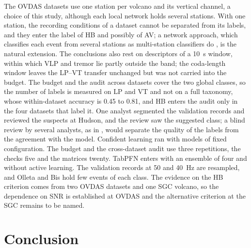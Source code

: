 \documentclass[pdflatex,sn-mathphys-num]{sn-jnl}
\begin{document}
The OVDAS datasets use one station per volcano and its vertical channel, a
choice of this study, although each local network holds several stations.
With one station, the recording conditions of a dataset cannot be separated
from its labels, and they enter the label of HB and possibly of AV; a
network approach, which classifies each event from several stations as
multi-station classifiers do \cite{salazar_multi-station_2023,ferreira_deep_2023},
is the natural extension. The conclusions also rest on descriptors of a
10~s window, within which
VLP and tremor lie partly outside the band; the coda-length window leaves
the LP--VT transfer unchanged but was not carried into the budget. The
budget and the audit across datasets cover the two global classes, so the
number of labels is measured on LP and VT and not on a full taxonomy, whose
within-dataset accuracy is 0.45 to 0.81, and HB enters the audit only in
the four datasets that label it. One analyst segmented the validation records and
reviewed the suspects at Hudson, and the review saw the suggested class; a
blind review by several analysts, as in \cite{anzieta_cleaning_2023}, would
separate the quality of the labels from the agreement with the model.
Confident learning ran with models of fixed configuration. The budget and the cross-dataset audit use three
repetitions, the checks five and the matrices twenty. TabPFN enters with an
ensemble of four and without active learning. The validation records at 50
and 40~Hz are resampled, and Olleta and Bis hold few events of each class.
The evidence on the HB criterion comes from two OVDAS datasets and one SGC
volcano, so the dependence on SNR is established at OVDAS and the
alternative criterion at the SGC remains to be named.

\section{Conclusion}\label{sec:conclusion}
\end{document}
